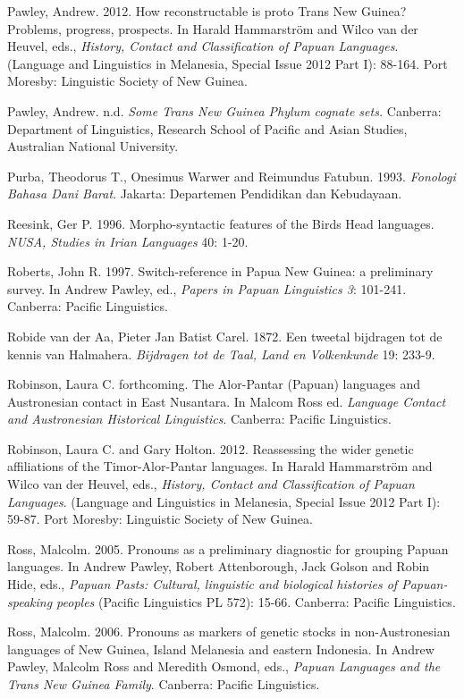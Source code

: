 Pawley, Andrew. 2012. How reconstructable is proto Trans New Guinea? Problems, progress, prospects. In Harald Hammarstr\"om and Wilco van der Heuvel, eds., \textit{History, Contact and Classification of Papuan Languages}. (Language and Linguistics in Melanesia, Special Issue 2012 Part I): 88-164. Port Moresby: Linguistic Society of New Guinea.

Pawley, Andrew. n.d. \textit{Some Trans New Guinea Phylum cognate sets.} Canberra: Department of Linguistics, Research School of Pacific and Asian Studies, Australian National University.

Purba, Theodorus T., Onesimus Warwer and Reimundus Fatubun. 1993. \textit{Fonologi Bahasa Dani Barat}. Jakarta: Departemen Pendidikan dan Kebudayaan.

Reesink, Ger P. 1996. Morpho-syntactic features of the Bird{\textquotesingle}s Head languages. \textit{NUSA, Studies in Irian Languages} 40: 1-20.

Roberts, John R. 1997. Switch-reference in Papua New Guinea: a preliminary survey. In Andrew Pawley, ed., \textit{Papers in Papuan Linguistics 3}: 101-241. Canberra: Pacific Linguistics.

Robide van der Aa, Pieter Jan Batist Carel. 1872. Een tweetal bijdragen tot de kennis van Halmahera. \textit{Bijdragen tot de Taal, Land en Volkenkunde} 19: 233-9.

Robinson, Laura C. forthcoming. The Alor-Pantar (Papuan) languages and Austronesian contact in East Nusantara. In Malcom Ross ed. \textit{Language Contact and Austronesian Historical Linguistics}. Canberra: Pacific Linguistics.

Robinson, Laura C. and Gary Holton. 2012. Reassessing the wider genetic affiliations of the Timor-Alor-Pantar languages. In Harald Hammarstr\"om and Wilco van der Heuvel, eds., \textit{History, Contact and Classification of Papuan Languages}. (Language and Linguistics in Melanesia, Special Issue 2012 Part I): 59-87. Port Moresby: Linguistic Society of New Guinea.

Ross, Malcolm. 2005. Pronouns as a preliminary diagnostic for grouping Papuan languages. In Andrew Pawley, Robert Attenborough, Jack Golson and Robin Hide, eds., \textit{Papuan Pasts: Cultural, linguistic and biological histories of Papuan-speaking peoples }(Pacific Linguistics PL 572): 15-66. Canberra: Pacific Linguistics.

Ross, Malcolm. 2006. Pronouns as markers of genetic stocks in non-Austronesian languages of New Guinea, Island Melanesia and eastern Indonesia. In Andrew Pawley, Malcolm Ross and Meredith Osmond, eds., \textit{Papuan Languages and the Trans New Guinea Family}. Canberra: Pacific Linguistics.

